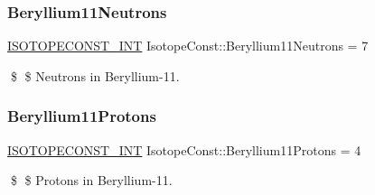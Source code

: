 \subsubsection{\texorpdfstring{Beryllium11\+Neutrons}{Beryllium11Neutrons}}
{\footnotesize\ttfamily \mbox{\hyperlink{group___isotope_const-_macros_ga5f18360b3e99483a35c32d789e62621c}{I\+S\+O\+T\+O\+P\+E\+C\+O\+N\+S\+T\+\_\+\+I\+NT}} Isotope\+Const\+::\+Beryllium11\+Neutrons = 7}

\$ \$ Neutrons in Beryllium-\/11. \mbox{\label{group___isotope_const-_beryllium-_be11_ga20091d7adbfbb989afdb7dc48f198194}} 
\subsubsection{\texorpdfstring{Beryllium11\+Protons}{Beryllium11Protons}}
{\footnotesize\ttfamily \mbox{\hyperlink{group___isotope_const-_macros_ga5f18360b3e99483a35c32d789e62621c}{I\+S\+O\+T\+O\+P\+E\+C\+O\+N\+S\+T\+\_\+\+I\+NT}} Isotope\+Const\+::\+Beryllium11\+Protons = 4}

\$ \$ Protons in Beryllium-\/11. 